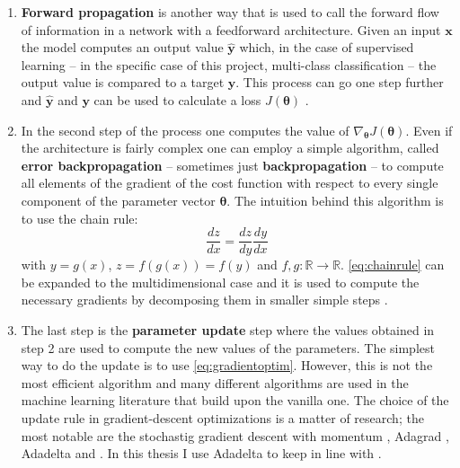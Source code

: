 \begin{enumerate}
    \item \textbf{Forward propagation} is another way that is used to call the forward flow of information in a network with a feedforward architecture. Given an input $\bm{x}$ the model computes an output value $\bm{\hat{y}}$ which, in the case of supervised learning -- in the specific case of this project, multi-class classification -- the output value is compared to a target $\bm{y}$. This process can go one step further and $\bm{\hat{y}}$ and $\bm{y}$ can be used to calculate a loss $J(\bm{\theta})$ \citep{Goodfellow2016}.
    
    \item In the second step of the process one computes the value of $\nabla_{\bm{\theta}} J(\bm{\theta})$. Even if the architecture is fairly complex one can employ a simple algorithm, called \textbf{error backpropagation} -- sometimes just \textbf{backpropagation} -- to compute all elements of the gradient of the cost function with respect to every single component of the parameter vector $\bm{\theta}$. The intuition behind this algorithm is to use the chain rule:
    \begin{equation} \label{eq:chainrule}
            \dfrac{dz}{dx} = \dfrac{dz}{dy} \dfrac{dy}{dx}
    \end{equation}
    with $y=g(x)$, $z=f(g(x))=f(y)$ and $f, g:\mathbb{R} \rightarrow \mathbb{R}$. \cref{eq:chainrule} can be expanded to the multidimensional case and it is used to compute the necessary gradients by decomposing them in smaller simple steps \citep{Bishop2006PatternLearning}. 
    
    \item The last step is the \textbf{parameter update} step where the values obtained in step 2 are used to compute the new values of the parameters. The simplest way to do the update is to use \cref{eq:gradientoptim}. However, this is not the most efficient algorithm \citep{Bishop2006PatternLearning} and many different algorithms are used in the machine learning literature that build upon the vanilla one. The choice of the update rule in gradient-descent optimizations is a matter of research; the most notable are the stochastig gradient descent with momentum \citep{Qian1999OnAlgorithms}, Adagrad \citep{Duchi2011AdaptiveOptimization}, Adadelta \citep{Zeiler2012ADADELTA:Method} and \citep{Kingma2014Adam:Optimization}. In this thesis I use Adadelta \citep{Zeiler2012ADADELTA:Method} to keep in line with \citet{Agrawal2019MachineImages}.

\end{enumerate}

